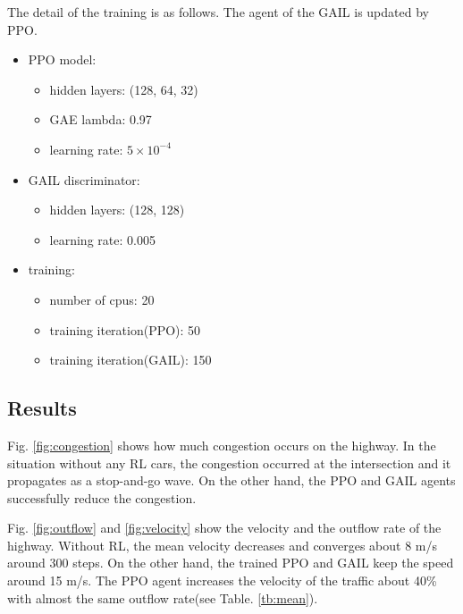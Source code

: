 The detail of the training is as follows. The agent of the GAIL is updated by PPO.

\begin{itemize}
    \item PPO model: 

    \begin{itemize}
        \item hidden layers: (128, 64, 32)
        \item GAE\cite{Schulman2015} lambda: 0.97
        \item learning rate: $5\times 10^{-4}$
    \end{itemize}

    \item GAIL discriminator:
    
    \begin{itemize}
        \item hidden layers: (128, 128)
        \item learning rate: 0.005
    \end{itemize}

    \item training:

    \begin{itemize}
        \item number of cpus: 20
        \item training iteration(PPO): 50
        \item training iteration(GAIL): 150
    \end{itemize}
\end{itemize}

\subsection{Results}

Fig. \ref{fig:congestion} shows how much congestion occurs on the highway. In the situation without any RL cars, the congestion occurred at the intersection and it propagates as a stop-and-go wave. On the other hand, the PPO and GAIL agents successfully reduce the congestion. 

Fig. \ref{fig:outflow} and \ref{fig:velocity} show the velocity and the outflow rate of the highway. Without RL, the mean velocity decreases and converges about 8 m/s around 300 steps. On the other hand, the trained PPO and GAIL keep the speed around 15 m/s. The PPO agent increases the velocity of the traffic about 40\% with almost the same outflow rate(see Table. \ref{tb:mean}).

